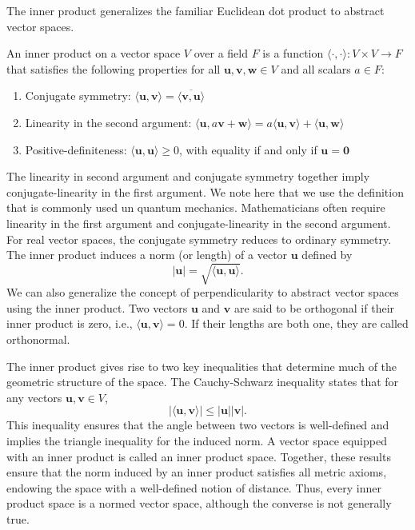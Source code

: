 The inner product generalizes the familiar Euclidean dot product to abstract vector spaces.
\begin{definition}\label{def:inner_product}
An inner product on a vector space $V$ over a field $F$ is a function $\langle\cdot,\cdot\rangle:V\times V\to F$ that satisfies the following properties for all $\symbf{u},\symbf{v},\symbf{w}\in V$ and all scalars $a\in F$:
\begin{enumerate}\def\labelenumi{\arabic{enumi}.}
\item Conjugate symmetry: $\langle\symbf{u},\symbf{v}\rangle=\overline{\langle\symbf{v},\symbf{u}\rangle}$
\item Linearity in the second argument: $\langle \symbf{u},a\symbf{v}+\symbf{w}\rangle=a\langle\symbf{u},\symbf{v}\rangle+\langle\symbf{u},\symbf{w}\rangle$
\item Positive-definiteness: $\langle\symbf{u},\symbf{u}\rangle\geq 0$, with equality if and only if $\symbf{u}=\symbf{0}$
\end{enumerate}
\end{definition}
The linearity in second argument and conjugate symmetry together imply conjugate-linearity in the first argument. We note here that we use the definition that is commonly used un quantum mechanics. Mathematicians often require linearity in the first argument and conjugate-linearity in the second argument. For real vector spaces, the conjugate symmetry reduces to ordinary symmetry. The inner product induces a norm (or length) of a vector $\symbf{u}$ defined by
\begin{equation}
\lvert\symbf{u}\rvert=\sqrt{\langle\symbf{u},\symbf{u}\rangle}.
\end{equation}
We can also generalize the concept of perpendicularity to abstract vector spaces using the inner product. Two vectors $\symbf{u}$ and $\symbf{v}$ are said to be orthogonal if their inner product is zero, i.e., $\langle\symbf{u},\symbf{v}\rangle=0$. If their lengths are both one, they are called orthonormal.

The inner product gives rise to two key inequalities that determine much of the geometric structure of the space. The Cauchy-Schwarz inequality states that for any vectors $\symbf{u},\symbf{v}\in V$,
\begin{equation}
\lvert\langle\symbf{u},\symbf{v}\rangle\rvert\leq\lvert\symbf{u}\rvert\lvert\symbf{v}\rvert.
\end{equation}
This inequality ensures that the angle between two vectors is well-defined and implies the triangle inequality for the induced norm. A vector space equipped with an inner product is called an inner product space. Together, these results ensure that the norm induced by an inner product satisfies all metric axioms, endowing the space with a well-defined notion of distance. Thus, every inner product space is a normed vector space, although the converse is not generally true.

